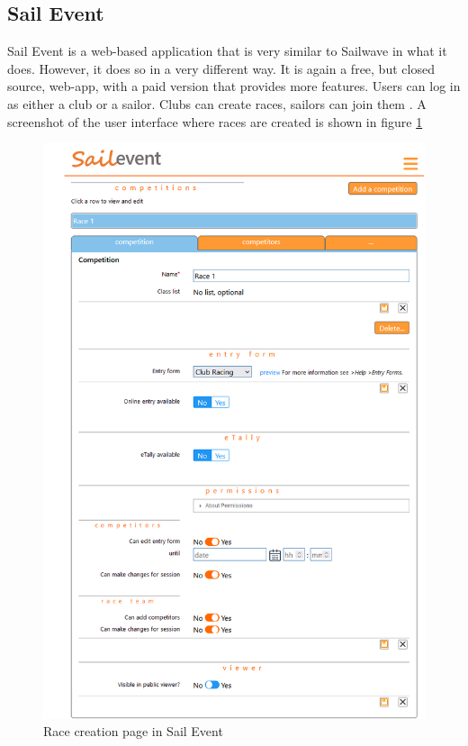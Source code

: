 \documentclass{l4proj}
\begin{document}
\subsection{Sail Event}

Sail Event is a web-based application that is very similar to Sailwave in what it does. However, it does so in a very different way. It is again a free, but closed source, web-app, with a paid version that provides more features. Users can log in as either a club or a sailor. Clubs can create races, sailors can join them \citep{SailEvent}. A screenshot of the user interface where races are created is shown in figure \ref{fig:sailEvent}

\begin{figure}[H]
    \centering
    \includegraphics[width=1\linewidth]{images/Sailevent.png} 

    \caption{Race creation page in Sail Event \citep{SailEvent}
    }

    \label{fig:sailEvent}
\end{figure}
\end{document}
